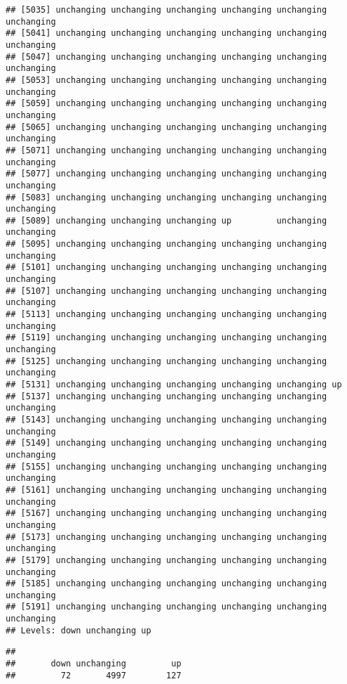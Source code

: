 \documentclass[]{article}
\newenvironment{Shaded}{\begin{snugshade}}{\end{snugshade}}
\newcommand{\KeywordTok}[1]{\textcolor[rgb]{0.13,0.29,0.53}{\textbf{#1}}}
\newcommand{\OperatorTok}[1]{\textcolor[rgb]{0.81,0.36,0.00}{\textbf{#1}}}
\newcommand{\NormalTok}[1]{#1}
\begin{document}
\begin{verbatim}
## [5035] unchanging unchanging unchanging unchanging unchanging unchanging
## [5041] unchanging unchanging unchanging unchanging unchanging unchanging
## [5047] unchanging unchanging unchanging unchanging unchanging unchanging
## [5053] unchanging unchanging unchanging unchanging unchanging unchanging
## [5059] unchanging unchanging unchanging unchanging unchanging unchanging
## [5065] unchanging unchanging unchanging unchanging unchanging unchanging
## [5071] unchanging unchanging unchanging unchanging unchanging unchanging
## [5077] unchanging unchanging unchanging unchanging unchanging unchanging
## [5083] unchanging unchanging unchanging unchanging unchanging unchanging
## [5089] unchanging unchanging unchanging up         unchanging unchanging
## [5095] unchanging unchanging unchanging unchanging unchanging unchanging
## [5101] unchanging unchanging unchanging unchanging unchanging unchanging
## [5107] unchanging unchanging unchanging unchanging unchanging unchanging
## [5113] unchanging unchanging unchanging unchanging unchanging unchanging
## [5119] unchanging unchanging unchanging unchanging unchanging unchanging
## [5125] unchanging unchanging unchanging unchanging unchanging unchanging
## [5131] unchanging unchanging unchanging unchanging unchanging up        
## [5137] unchanging unchanging unchanging unchanging unchanging unchanging
## [5143] unchanging unchanging unchanging unchanging unchanging unchanging
## [5149] unchanging unchanging unchanging unchanging unchanging unchanging
## [5155] unchanging unchanging unchanging unchanging unchanging unchanging
## [5161] unchanging unchanging unchanging unchanging unchanging unchanging
## [5167] unchanging unchanging unchanging unchanging unchanging unchanging
## [5173] unchanging unchanging unchanging unchanging unchanging unchanging
## [5179] unchanging unchanging unchanging unchanging unchanging unchanging
## [5185] unchanging unchanging unchanging unchanging unchanging unchanging
## [5191] unchanging unchanging unchanging unchanging unchanging unchanging
## Levels: down unchanging up
\end{verbatim}

\begin{Shaded}
\end{Shaded}

\begin{verbatim}
## 
##       down unchanging         up 
##         72       4997        127
\end{verbatim}
\end{document}
